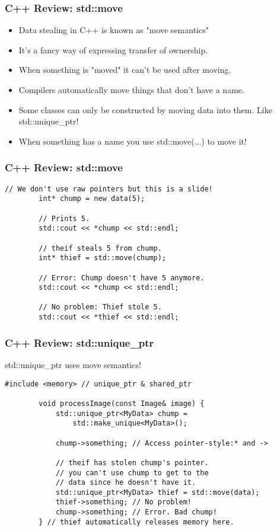 \documentclass{beamer}
\begin{document}
\begin{frame}
	\frametitle{C++ Review: std::move}
	\begin{itemize}
		\item Data stealing in C++ is known as "move semantics"
		\item It's a fancy way of expressing transfer of ownership.
		\item When something is "moved" it can't be used after moving.
		\item Compilers automatically move things that don't have a name.
		\item Some classes can only be constructed by moving data into them. Like std::unique\_ptr!
		\item When something has a name you use std::move(...) to move it!
	\end{itemize}
\end{frame}

\begin{frame}[fragile]
	\frametitle{C++ Review: std::move}
	\begin{lstlisting}[language=nuclear]
		// We don't use raw pointers but this is a slide!
		int* chump = new data(5);

		// Prints 5.
		std::cout << *chump << std::endl;

		// theif steals 5 from chump.
		int* thief = std::move(chump);

		// Error: Chump doesn't have 5 anymore.
		std::cout << *chump << std::endl;

		// No problem: Thief stole 5.
		std::cout << *thief << std::endl;
	\end{lstlisting}
\end{frame}

\begin{frame}[fragile]
	\frametitle{C++ Review: std::unique\_ptr}

	std::unique\_ptr uses move semantics!	

	\begin{lstlisting}[language=nuclear]
		#include <memory> // unique_ptr & shared_ptr

		void processImage(const Image& image) {
			std::unique_ptr<MyData> chump = 
				std::make_unique<MyData>();

			chump->something; // Access pointer-style:* and ->
			
			// theif has stolen chump's pointer.
			// you can't use chump to get to the
			// data since he doesn't have it.
			std::unique_ptr<MyData> thief = std::move(data); 
			thief->something; // No problem!
			chump->something; // Error. Bad chump!
		} // thief automatically releases memory here. 
	\end{lstlisting}
\end{frame}
\end{document}
